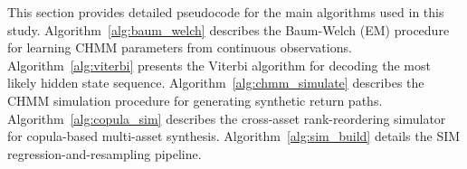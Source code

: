 This section provides detailed pseudocode for the main algorithms used in this study.
Algorithm~\ref{alg:baum_welch} describes the Baum-Welch (EM) procedure for learning CHMM parameters from continuous observations.
Algorithm~\ref{alg:viterbi} presents the Viterbi algorithm for decoding the most likely hidden state sequence.
Algorithm~\ref{alg:chmm_simulate} describes the CHMM simulation procedure for generating synthetic return paths.
Algorithm~\ref{alg:copula_sim} describes the cross-asset rank-reordering simulator for copula-based multi-asset synthesis.
Algorithm~\ref{alg:sim_build} details the SIM regression-and-resampling pipeline.


